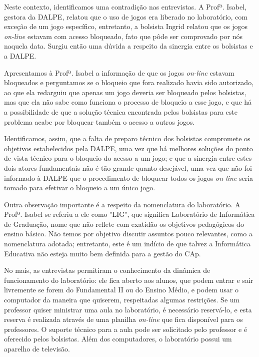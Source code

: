 Neste contexto, identificamos uma contradição nas entrevistas. A Profª. Isabel, gestora da DALPE, relatou que o uso de jogos era liberado no laboratório, com exceção de um jogo específico, entretanto, a bolsista Ingrid relatou que os jogos \textit{on-line} estavam com acesso bloqueado, fato que pôde ser comprovado por nós naquela data. Surgiu então uma dúvida a respeito da sinergia entre os bolsistas e a DALPE.

Apresentamos à Profª. Isabel a informação de que os jogos \textit{on-line} estavam bloqueados e perguntamos se o bloqueio que fora realizado havia sido autorizado, ao que ela redarguiu que apenas um jogo deveria ser bloqueado pelos bolsistas, mas que ela não sabe como funciona o processo de bloqueio a esse jogo, e que há a possibilidade de que a solução técnica encontrada pelos bolsistas para este problema acabe por bloquear também o acesso a outros jogos.

Identificamos, assim, que a falta de preparo técnico dos bolsistas compromete os objetivos estabelecidos pela DALPE, uma vez que há melhores soluções do ponto de vista técnico para o bloqueio do acesso a um jogo; e que a sinergia entre estes dois atores fundamentais não é tão grande quanto desejável, uma vez que não foi informado à DALPE que o procedimento de bloquear todos os jogos \textit{on-line} seria tomado para efetivar o bloqueio a um único jogo.

Outra observação importante é a respeito da nomenclatura do laboratório. A Profª. Isabel se referiu a ele como "LIG", que significa Laboratório de Informática de Graduação, nome que não reflete com exatidão os objetivos pedagógicos do ensino básico. Não temos por objetivo discutir assuntos pouco relevantes, como a nomenclatura adotada; entretanto, este é um indício de que talvez a Informática Educativa não esteja muito bem definida para a gestão do CAp.

No mais, as entrevistas permitiram o conhecimento da dinâmica de funcionamento do laboratório: ele fica aberto aos alunos, que podem entrar e sair livremente se forem do Fundamental II ou do Ensino Médio, e podem usar o computador da maneira que quiserem, respeitadas algumas restrições. Se um professor quiser ministrar uma aula no laboratório, é necessário reservá-lo, e esta reserva é realizada através de uma planilha \textit{on-line} que fica disponível para os professores. O suporte técnico para a aula pode ser solicitado pelo professor e é oferecido pelos bolsistas. Além dos computadores, o laboratório possui um aparelho de televisão.
